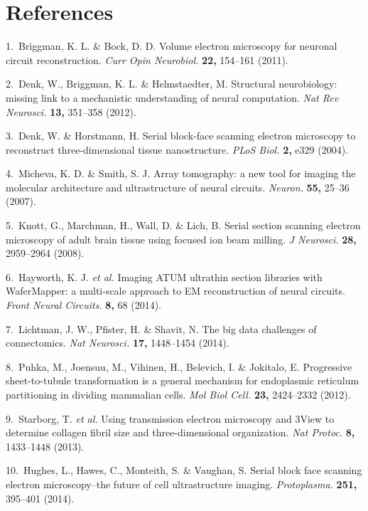 \documentclass{article}
\newenvironment{reflist}{\par\small\setlength{\parindent}{0pt}\everypar{\hangindent=2.2em\hangafter=1}}{\par}
\begin{document}
\section*{References}
\begin{reflist}
1.~Briggman, K. L. \& Bock, D. D. Volume electron microscopy for neuronal circuit reconstruction. \emph{Curr Opin Neurobiol.} \textbf{22,} 154–161 (2011).

2.~Denk, W., Briggman, K. L. \& Helmstaedter, M. Structural neurobiology: missing link to a mechanistic understanding of neural computation. \emph{Nat Rev Neurosci.} \textbf{13,} 351–358 (2012).

3.~Denk, W. \& Horstmann, H. Serial block-face scanning electron microscopy to reconstruct three-dimensional tissue nanostructure. \emph{PLoS Biol.} \textbf{2,} e329 (2004).

4.~Micheva, K. D. \& Smith, S. J. Array tomography: a new tool for imaging the molecular architecture and ultrastructure of neural circuits. \emph{Neuron.} \textbf{55,} 25–36 (2007).

5.~Knott, G., Marchman, H., Wall, D. \& Lich, B. Serial section scanning electron microscopy of adult brain tissue using focused ion beam milling. \emph{J Neurosci.} \textbf{28,} 2959–2964 (2008).

6.~Hayworth, K. J. \emph{et al.} Imaging ATUM ultrathin section libraries with WaferMapper: a multi-scale approach to EM reconstruction of neural circuits. \emph{Front Neural Circuits.} \textbf{8,} 68 (2014).

7.~Lichtman, J. W., Pfister, H. \& Shavit, N. The big data challenges of connectomics. \emph{Nat Neurosci.} \textbf{17,} 1448–1454 (2014).

8.~Puhka, M., Joensuu, M., Vihinen, H., Belevich, I. \& Jokitalo, E. Progressive sheet-to-tubule transformation is a general mechanism for endoplasmic reticulum partitioning in dividing mammalian cells. \emph{Mol Biol Cell.} \textbf{23,} 2424–2332 (2012).

9.~Starborg, T. \emph{et al.} Using transmission electron microscopy and 3View to determine collagen fibril size and three-dimensional organization. \emph{Nat Protoc.} \textbf{8,} 1433–1448 (2013).

10.~Hughes, L., Hawes, C., Monteith, S. \& Vaughan, S. Serial block face scanning electron microscopy–the future of cell ultrastructure imaging. \emph{Protoplasma.} \textbf{251,} 395–401 (2014).


\end{reflist}
\end{document}
